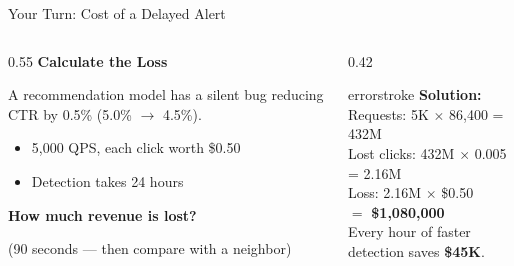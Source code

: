 \documentclass[aspectratio=169, 12pt]{beamer}
\begin{document}
\begin{frame}{Your Turn: Cost of a Delayed Alert}

\small
\begin{columns}[T]
  \begin{column}{0.55\textwidth}
    {\normalsize\bfseries Calculate the Loss}

    \vspace{0.2cm}
    A recommendation model has a silent bug reducing CTR by 0.5\% (5.0\% $\to$ 4.5\%).
    \begin{itemize}
      \item 5,000 QPS, each click worth \$0.50
      \item Detection takes 24 hours
    \end{itemize}

    \vspace{0.15cm}
    \textbf{How much revenue is lost?}

    {\footnotesize\textcolor{midgray}{(90 seconds --- then compare with a neighbor)}}
  \end{column}
  \begin{column}{0.42\textwidth}
    \pause
    \begin{mlsyscard}{errorstroke}
    \textbf{Solution:}\\[0.1cm]
    {\footnotesize
    Requests: 5K $\times$ 86,400 = 432M\\
    Lost clicks: 432M $\times$ 0.005 = 2.16M\\
    Loss: 2.16M $\times$ \$0.50\\[0.1cm]
    $=$ \textcolor{errorstroke}{\textbf{\$1,080,000}}\\[0.1cm]
    Every hour of faster detection saves \textbf{\$45K}.
    }
    \end{mlsyscard}
  \end{column}
\end{columns}

\end{frame}
\end{document}
